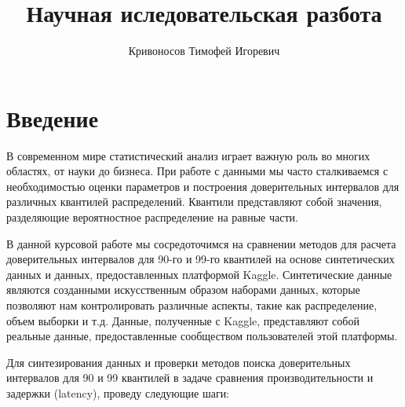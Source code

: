 \documentclass[specialist,
               substylefile = spbu_report.rtx,
               subf,href,colorlinks=true, 12pt]{disser}
\begin{document}
%
%


\title{Научная иследовательская разбота}


\author{Кривоносов Тимофей Игоревич}



\date{\number\year}

\maketitle

\newpage
\tableofcontents
\newpage
\section{Введение}
В современном мире статистический анализ играет важную роль во многих областях, от науки до бизнеса. При работе с данными мы часто сталкиваемся с необходимостью оценки параметров и построения доверительных интервалов для различных квантилей распределений. Квантили представляют собой значения, разделяющие вероятностное распределение на равные части.

В данной курсовой работе мы сосредоточимся на сравнении методов для расчета доверительных интервалов для 90-го и 99-го квантилей на основе синтетических данных и данных, предоставленных платформой Kaggle. Синтетические данные являются созданными искусственным образом наборами данных, которые позволяют нам контролировать различные аспекты, такие как распределение, объем выборки и т.д. Данные, полученные с Kaggle, представляют собой реальные данные, предоставленные сообществом пользователей этой платформы.

Для синтезирования данных и проверки методов поиска доверительных интервалов для 90 и 99 квантилей в задаче сравнения производительности и задержки (latency), проведу следующие шаги:
\end{document}
